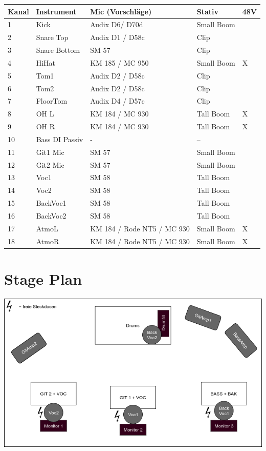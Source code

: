 \documentclass{article}
\begin{document}
  \begin{tabular}{|l|l|l|l|l|}
  \hline
  \textbf{Kanal} & \textbf{Instrument} & \textbf{Mic (Vorschläge)} & \textbf{Stativ} & \textbf{48V}\\
  \hline
  1  & Kick           & Audix D6/ D70d             & Small Boom &   \\
  2  & Snare Top      & Audix D1 / D58c            & Clip       &   \\
  3  & Snare Bottom   & SM 57                      & Clip       &   \\
  4  & HiHat          & KM 185 / MC 950            & Small Boom & X \\
  5  & Tom1           & Audix D2 / D58c            & Clip       &   \\
  6  & Tom2           & Audix D2 / D58c            & Clip       &   \\
  7  & FloorTom       & Audix D4 / D57c            & Clip       &   \\
  8  & OH L           & KM 184 / MC 930            & Tall Boom  & X \\
  9  & OH R           & KM 184 / MC 930            & Tall Boom  & X \\
  10 & Bass DI Passiv & -                          & --         &   \\
  11 & Git1 Mic       & SM 57                      & Small Boom &   \\
  12 & Git2 Mic       & SM 57                      & Small Boom &   \\
  13 & Voc1           & SM 58                      & Tall Boom  &   \\
  14 & Voc2           & SM 58                      & Tall Boom  &   \\
  15 & BackVoc1       & SM 58                      & Tall Boom  &   \\
  16 & BackVoc2       & SM 58                      & Tall Boom  &   \\
  17 & AtmoL          & KM 184 / Rode NT5 / MC 930 & Small Boom & X \\
  18 & AtmoR          & KM 184 / Rode NT5 / MC 930 & Small Boom & X \\
  \hline
  \end{tabular}

  \section*{Stage Plan}

  \includegraphics[width=\textwidth]{figures/StagePlan}
\end{document}
